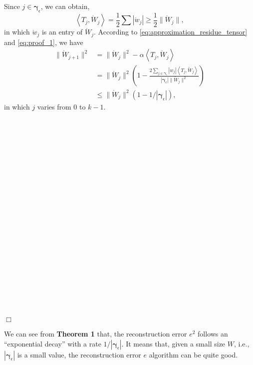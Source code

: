 \documentclass[twoside,twocolumn]{article}
\begin{document}
Since $j\in \boldsymbol{\gamma }_{\epsilon}$, we can obtain,
\begin{equation}\label{eq:proof_1}
\left< T_j,\mathring{W}_j \right> =\frac{1}{2} \sum{\left| \mathring{w}_j \right|\geqslant \frac{1}{2} \lVert \mathring{W}_j \rVert},
\end{equation}
in which $\mathring{w}_j$ is an entry of $\mathring{W}_j$. According to \eqref{eq:approximation_residue_tensor} and \eqref{eq:proof_1}, we have
\begin{equation}\label{eq:proof_2}
\begin{aligned}
\lVert \mathring{W}_{j+1} \rVert ^2&=\lVert \mathring{W}_j \rVert ^2-\alpha \left< T_j,\mathring{W}_j \right>
\\
&=\lVert \mathring{W}_j \rVert^2 \left( 1-\frac{2\sum_{j\in \boldsymbol{\gamma }_{\epsilon}}{\left| w_j \right|}\left< T_j,\mathring{W}_j \right>}{\left| \boldsymbol{\gamma }_{\epsilon} \right|\lVert \mathring{W}_j \rVert ^2} \right)
\\
&\leqslant \lVert \mathring{W}_j \rVert ^2\left( 1-\text{1/}\left| \boldsymbol{\gamma }_{\epsilon} \right| \right),
\end{aligned}
\end{equation}
in which $j$ varies from 0 to $k-1$. \\\\\\\\\\\\\\\\\\\\\\\\\\\\\\\\\\\\\\\\\\\\$\Box$

We can see from \textbf{Theorem 1} that, the reconstruction error $e^2$ follows an ``exponential decay'' with a rate $\text{1/}\left| \boldsymbol{\gamma }_{\epsilon} \right|$. It means that, given a small size $W$, i.e., $|\boldsymbol{\gamma }_{\epsilon}|$ is a small value, the reconstruction error $e$ algorithm can be quite good.
\end{document}
